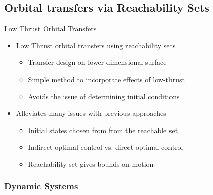 \subsection[Low Thrust Transfers]{Orbital transfers via Reachability Sets}

\begin{frame}{Low Thrust Orbital Transfers} %
    \begin{itemize}
        \item Low Thrust orbital transfers using reachability sets 
        \begin{itemize}
            \item Transfer design on lower dimensional \Poincare surface
            \item Simple method to incorporate effects of low-thrust 
            \item Avoids the issue of determining initial conditions
        \end{itemize}
    \pause
        \item Alleviates many issues with previous approaches
        \begin{itemize}
            \item Initial states chosen from from the reachable set
            \item Indirect optimal control vs. direct optimal control
            \item Reachability set gives bounds on motion
        \end{itemize}    
    \end{itemize}

\end{frame} %

\subsubsection[Dynamic Systems Theory Review]{Dynamic Systems}

